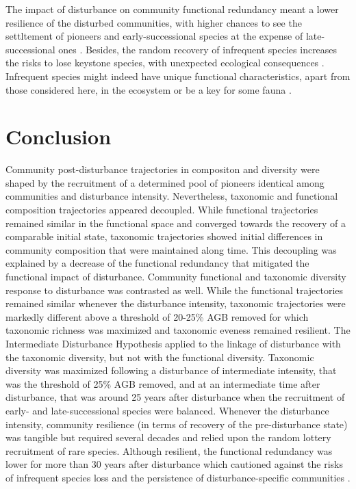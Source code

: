 \documentclass[fleqn,10pt]{ArtEcoFoG} %
\begin{document}
The impact of disturbance on community functional redundancy meant a
lower resilience of the disturbed communities, with higher chances to
see the settltement of pioneers and early-successional species at the
expense of late-successional ones \citep{Haddad2008}. Besides, the
random recovery of infrequent species increases the risks to lose
keystone species, with unexpected ecological consequences
\citep{Jones1994, Chazdon2003a, Diaz2005}. Infrequent species might
indeed have unique functional characteristics, apart from those
considered here, in the ecosystem or be a key for some fauna
\citep{Schleuning2016}.

\section{Conclusion}\label{conclusion}

Community post-disturbance trajectories in compositon and diversity were
shaped by the recruitment of a determined pool of pioneers identical
among communities and disturbance intensity. Nevertheless, taxonomic and
functional composition trajectories appeared decoupled. While functional
trajectories remained similar in the functional space and converged
towards the recovery of a comparable initial state, taxonomic
trajectories showed initial differences in community composition that
were maintained along time. This decoupling was explained by a decrease
of the functional redundancy that mitigated the functional impact of
disturbance. Community functional and taxonomic diversity response to
disturbance was contrasted as well. While the functional trajectories
remained similar whenever the disturbance intensity, taxonomic
trajectories were markedly different above a threshold of 20-25\% AGB
removed for which taxonomic richness was maximized and taxonomic eveness
remained resilient. The Intermediate Disturbance Hypothesis applied to
the linkage of disturbance with the taxonomic diversity, but not with
the functional diversity. Taxonomic diversity was maximized following a
disturbance of intermediate intensity, that was the threshold of 25\%
AGB removed, and at an intermediate time after disturbance, that was
around 25 years after disturbance when the recruitment of early- and
late-successional species were balanced. Whenever the disturbance
intensity, community resilience (in terms of recovery of the
pre-disturbance state) was tangible but required several decades and
relied upon the random lottery recruitment of rare species. Although
resilient, the functional redundancy was lower for more than 30 years
after disturbance which cautioned against the risks of infrequent
species loss and the persistence of disturbance-specific communities
\citep{Herault2018}.
\end{document}

